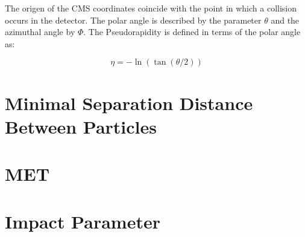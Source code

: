 The origen of the CMS coordinates coincide with the point in which a collision occurs in the detector. 
The polar angle is described by the parameter $\theta$ and the azimuthal angle by $\Phi$. The Pseudorapidity is defined in terms of the polar angle as:

\begin{equation}
 \eta = - \ln \left( \tan (\theta /2 ) \right)
\end{equation}

 
 
 \section{Minimal Separation Distance Between Particles}
 
 \section{MET}

 
 \section{Impact Parameter}

 
 